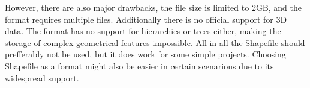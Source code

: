 However, there are also major drawbacks, the file size is limited to 2GB, and the format requires multiple files. Additionally there is no official support for 3D data. The format has no support for hierarchies or trees either, making the storage of complex geometrical features impossible. All in all the Shapefile should prefferably not be used, but it does work for some simple projects. Choosing Shapefile as a format might also be easier in certain scenarious due to its widespread support.
